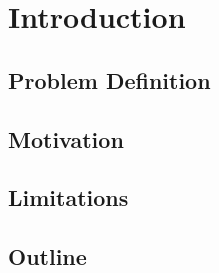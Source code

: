 \chapter{Introduction}

\section{Problem Definition}

\section{Motivation}

\section{Limitations}

\section{Outline}